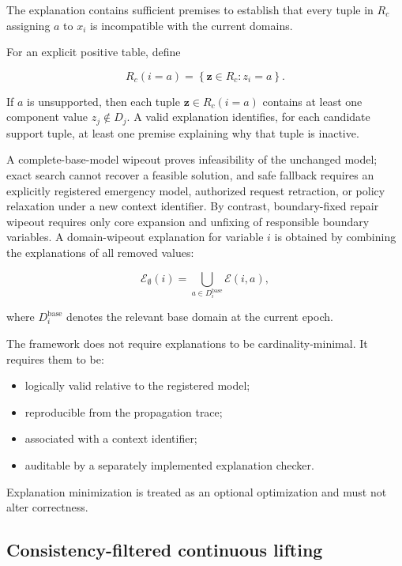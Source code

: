 \documentclass[pdflatex,sn-mathphys-num,iicol,oneside]{sn-jnl}
\begin{document}
The explanation contains sufficient premises to establish that every
tuple in $R_c$ assigning $a$ to $x_i$ is incompatible with the current
domains.

For an explicit positive table, define

\begin{equation}
R_c(i=a)
=
\left\{
\bm{z}\in R_c:z_i=a
\right\}.
\end{equation}

If $a$ is unsupported, then each tuple
$\bm{z}\in R_c(i=a)$ contains at least one component value
$z_j\notin D_j$. A valid explanation identifies, for each candidate
support tuple, at least one premise explaining why that tuple is
inactive.

A complete-base-model wipeout proves infeasibility of the unchanged model; exact search cannot recover a feasible solution, and safe fallback requires an explicitly registered emergency model, authorized request retraction, or policy relaxation under a new context identifier. By contrast, boundary-fixed repair wipeout requires only core expansion and unfixing of responsible boundary variables. A domain-wipeout explanation for variable $i$ is obtained by combining
the explanations of all removed values:

\begin{equation}
\mathcal{E}_{\emptyset}(i)
=
\bigcup_{a\in D_i^{\mathrm{base}}}
\mathcal{E}(i,a),
\label{eq:wipeout-explanation}
\end{equation}

where $D_i^{\mathrm{base}}$ denotes the relevant base domain at the
current epoch.

The framework does not require explanations to be
cardinality-minimal. It requires them to be:

\begin{itemize}
    \item logically valid relative to the registered model;
    \item reproducible from the propagation trace;
    \item associated with a context identifier;
    \item auditable by a separately implemented explanation checker.
\end{itemize}

Explanation minimization is treated as an optional optimization and
must not alter correctness.

\subsection{Consistency-filtered continuous lifting}
\end{document}

